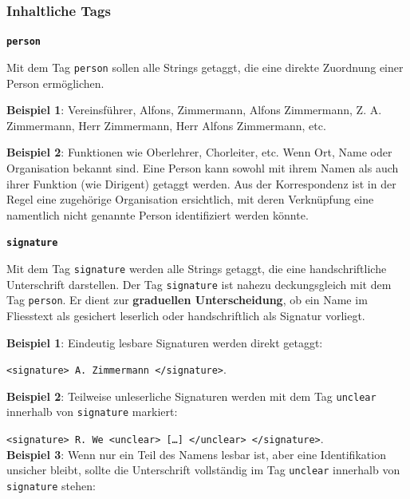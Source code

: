 \documentclass[12pt, a4paper, ngerman, bidi=default]{article}
\newcommand{\code}[1]{\colorbox{VeryLightGray}{\texttt{#1}}} %
\begin{document}
    \subsubsection{Inhaltliche Tags}
    \begin{description}
    \item\texttt{\textbf{{\colorbox{person}{person}}}}
        
    Mit dem Tag \texttt{\colorbox{person}{person}} sollen alle Strings getaggt, die eine direkte Zuordnung einer Person ermöglichen.
    
    \noindent \textbf{ Beispiel 1}: Vereinsführer, Alfons, Zimmermann, Alfons Zimmermann, Z. A. Zimmermann, Herr Zimmermann, Herr Alfons Zimmermann, etc. 

    \textbf{ Beispiel 2}: Funktionen wie Oberlehrer, Chorleiter, etc.
    Wenn Ort, Name oder Organisation bekannt sind. Eine Person kann sowohl mit ihrem Namen als auch ihrer Funktion (wie Dirigent) getaggt werden.  
    Aus der Korrespondenz ist in der Regel eine zugehörige Organisation ersichtlich, mit deren Verknüpfung eine namentlich nicht genannte Person identifiziert werden könnte.

    
    \item\texttt{\textbf{{\colorbox{signature}{signature}}}}
        
    Mit dem Tag \texttt{\colorbox{signature}{signature}} werden alle Strings getaggt, die eine handschriftliche Unterschrift darstellen.  
    Der Tag \texttt{\colorbox{signature}{signature}} ist nahezu deckungsgleich mit dem Tag \texttt{\colorbox{person}{person}}.  
    Er dient zur \textbf{graduellen Unterscheidung}, ob ein Name im Fliesstext als gesichert leserlich oder handschriftlich als Signatur vorliegt.  
    
    \noindent \textbf{ Beispiel 1}: Eindeutig lesbare Signaturen werden direkt getaggt:  

    \code{<signature>~A. Zimmermann~</signature>}. 

    \textbf{ Beispiel 2}: Teilweise unleserliche Signaturen werden mit dem Tag \texttt{\colorbox{unclear}{unclear}} innerhalb von \texttt{\colorbox{signature}{signature}} markiert: 

    \code{<signature>~R. We~<unclear>~[\ldots]~</unclear>~</signature>}. \\
    
    \textbf{ Beispiel 3}: Wenn nur ein Teil des Namens lesbar ist, aber eine Identifikation unsicher bleibt, sollte die Unterschrift vollständig im Tag \texttt{\colorbox{unclear}{unclear}} innerhalb von \texttt{\colorbox{signature}{signature}} stehen:\\


\end{description}
\end{document}
